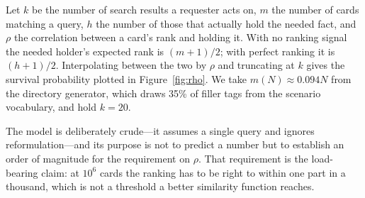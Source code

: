 

Let $k$ be the number of search results a requester acts on, $m$ the number of cards
matching a query, $h$ the number of those that actually hold the needed fact, and $\rho$
the correlation between a card's rank and holding it. With no ranking signal the needed
holder's expected rank is $(m+1)/2$; with perfect ranking it is $(h+1)/2$. Interpolating
between the two by $\rho$ and truncating at $k$ gives the survival probability plotted in
Figure~\ref{fig:rho}. We take $m(N) \approx 0.094N$ from the directory generator, which
draws 35\% of filler tags from the scenario vocabulary, and hold $k=20$.

The model is deliberately crude---it assumes a single query and ignores reformulation---and
its purpose is not to predict a number but to establish an order of magnitude for the
requirement on $\rho$. That requirement is the load-bearing claim: at $10^6$ cards the
ranking has to be right to within one part in a thousand, which is not a threshold a
better similarity function reaches.

